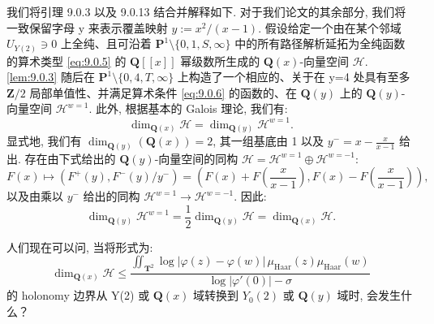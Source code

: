 \begin{remark}\label{rem:9.0.20}
我们将引理 9.0.3 以及 9.0.13 结合并解释如下. 
对于我们论文的其余部分, 我们将一致保留字母 y 来表示覆盖映射 \(y := x^2/(x-1)\). 
假设给定一个由在某个邻域 \(U_{Y(2)} \ni 0\) 上全纯、且可沿着 \(\mathbf{P}^1 \setminus \{0,1,S,\infty\}\) 中的所有路径解析延拓为全纯函数的算术类型 \eqref{eq:9.0.5} 的 \(\mathbf{Q}[\![x]\!]\) 幂级数所生成的 \(\mathbf{Q}(x)\)-向量空间 \(\mathcal{H}\). 
\autoref{lem:9.0.3} 随后在 \(\mathbf{P}^1 \setminus \{0,4,T,\infty\}\) 上构造了一个相应的、关于在 y=4 处具有至多 \(\mathbf{Z}/2\) 局部单值性、并满足算术条件 \eqref{eq:9.0.6} 的函数的、在 \(\mathbf{Q}(y)\) 上的 \(\mathbf{Q}(y)\)-向量空间 \(\mathcal{H}^{w=1}\). 
此外, 根据基本的 Galois 理论, 我们有:
\begin{equation}\label{eq:9.0.21}
\dim_{\mathbf{Q}(x)} \mathcal{H} = \dim_{\mathbf{Q}(y)} \mathcal{H}^{w=1}.
\end{equation}
显式地, 我们有 \(\dim_{\mathbf{Q}(y)}(\mathbf{Q}(x)) = 2\), 
其一组基底由 1 以及 \(y^- = x - \frac{x}{x-1}\) 给出. 
存在由下式给出的 \(\mathbf{Q}(y)\)-向量空间的同构 \(\mathcal{H} = \mathcal{H}^{w=1} \oplus \mathcal{H}^{w=-1}\):
\[ F(x) \mapsto \left(F^+(y), F^-(y)/y^-\right) = \left(F(x) + F\left(\frac{x}{x-1}\right), F(x) - F\left(\frac{x}{x-1}\right)\right), \]
以及由乘以 \(y^-\) 给出的同构 \(\mathcal{H}^{w=1} \to \mathcal{H}^{w=-1}\). 
因此:
\[ \dim_{\mathbf{Q}(y)} \mathcal{H}^{w=1} = \frac{1}{2} \dim_{\mathbf{Q}(y)} \mathcal{H} = \dim_{\mathbf{Q}(x)} \mathcal{H}. \]

人们现在可以问, 当将形式为:
\begin{equation}\label{eq:9.0.22}
\dim_{\mathbf{Q}(x)} \mathcal{H} \leq \frac{\iint_{\mathbf{T}^2} \log |\varphi(z) - \varphi(w)| \, \mu_{\mathrm{Haar}}(z) \mu_{\mathrm{Haar}}(w)}{\log |\varphi'(0)| - \sigma}
\end{equation}
的 holonomy 边界从 Y(2) 或 \(\mathbf{Q}(x)\) 域转换到 \(Y_0(2)\) 或 \(\mathbf{Q}(y)\) 域时, 会发生什么？


\end{remark}
